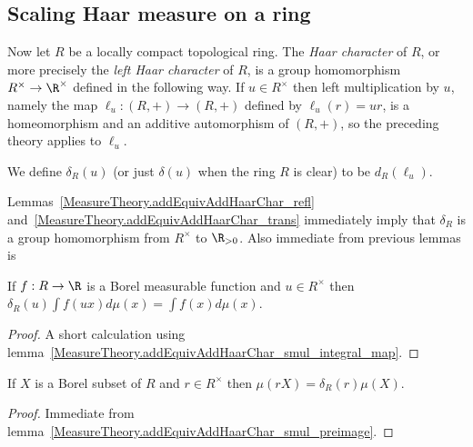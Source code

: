 \subsection{Scaling Haar measure on a ring}

Now let $R$ be a locally compact topological ring. The \emph{Haar character} of $R$,
or more precisely the \emph{left Haar character} of $R$, is a group homomorphism
$R^\times\to\R^\times$ defined in the following way. If $u\in R^\times$ then left multiplication
by $u$, namely the map $\ell_u:(R,+)\to(R,+)$ defined by $\ell_u(r)=ur$, is a homeomorphism and
an additive automorphism of $(R,+)$, so the preceding theory applies to $\ell_u$.

\begin{definition}
  \label{MeasureTheory.ringHaarChar}
  \leanok
  We define $\delta_R(u)$ (or just $\delta(u)$ when the ring $R$ is clear) to be $d_R(\ell_u)$.
\end{definition}

Lemmas~\ref{MeasureTheory.addEquivAddHaarChar_refl}
and~\ref{MeasureTheory.addEquivAddHaarChar_trans} immediately imply that $\delta_R$ is a group
homomorphism from $R^\times$ to $\R_{>0}$.
Also immediate from previous lemmas is

\begin{lemma}
  \label{MeasureTheory.ringHaarChar_mul_integral}
  \leanok
  If $f:R\to\R$ is a Borel measurable function and $u\in R^\times$ then
  $\delta_R(u)\int f(ux)d\mu(x)=\int f(x)d\mu(x)$.
\end{lemma}
\begin{proof}
  \leanok
  A short calculation using lemma~\ref{MeasureTheory.addEquivAddHaarChar_smul_integral_map}.
\end{proof}

\begin{lemma}
  \label{MeasureTheory.ringHaarChar_mul_volume}
  \leanok
  If $X$ is a Borel subset of $R$ and $r\in R^\times$ then $\mu(rX)=\delta_R(r)\mu(X)$.
\end{lemma}
\begin{proof}
   Immediate from lemma~\ref{MeasureTheory.addEquivAddHaarChar_smul_preimage}.
\end{proof}

